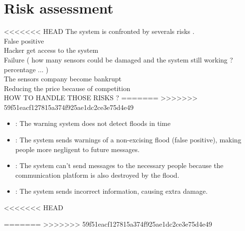\section{Risk assessment}

<<<<<<< HEAD
The system is confronted by severals risks .\\
False positive \\
Hacker get access to the system \\
Failure ( how many sensors could be damaged and the system still working ? percentage ... ) \\ 
The sensors company become bankrupt \\
Reducing the price because of competition \\

HOW TO HANDLE THOSE RISKS ?
=======
>>>>>>> 59f51eacf127815a374f925ae1dc2ce3e75d4e49
\begin{itemize}
	\item {}: The warning system does not detect floods in time
	\item {}: The system sends warnings of a non-excising flood (false positive), making people more negligent to future messages.
	\item {}: The system can't send messages to the necessary people because the communication platform is also destroyed by the flood.
	\item {}: The system sends incorrect information, causing extra damage.
\end{itemize}
<<<<<<< HEAD



=======
>>>>>>> 59f51eacf127815a374f925ae1dc2ce3e75d4e49
